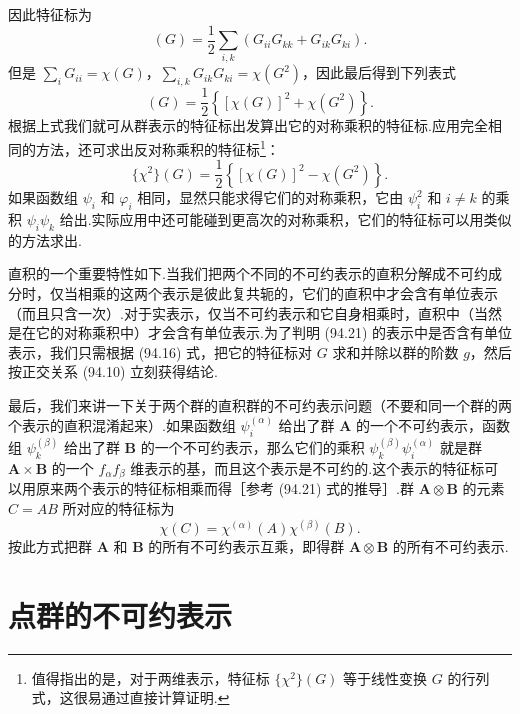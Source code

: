 因此特征标为
\begin{equation*}
  [\chi^2](G)=\frac{1}{2}\sum_{i,k}\left(G_{ii}G_{kk}+G_{ik}G_{ki}\right).
\end{equation*}
但是 $\sum_i G_{ii}=\chi(G)$，$\sum_{i,k}G_{ik}G_{ki}=\chi(G^2)$，因此最后得到下列表式
\begin{equation}
  [\chi^2](G)=\frac{1}{2}\left\{\left[\chi(G)\right]^2+\chi(G^2)\right\}.
\end{equation}
根据上式我们就可从群表示的特征标出发算出它的对称乘积的特征标.应用完全相同的方法，还可求出反对称乘积的特征标\footnote{值得指出的是，对于两维表示，特征标 $\{\chi^2\}(G)$ 等于线性变换 $G$ 的行列式，这很易通过直接计算证明.}：
\begin{equation}
  \{\chi^2\}(G)=\frac{1}{2}\left\{\left[\chi(G)\right]^2-\chi(G^2)\right\}.
\end{equation}
如果函数组 $\psi_i$ 和 $\varphi_i$ 相同，显然只能求得它们的对称乘积，它由 $\psi_i^2$ 和 $i\neq k$ 的乘积 $\psi_i\psi_k$ 给出.实际应用中还可能碰到更高次的对称乘积，它们的特征标可以用类似的方法求出.

直积的一个重要特性如下.当我们把两个不同的不可约表示的直积分解成不可约成分时，仅当相乘的这两个表示是彼此复共轭的，它们的直积中才会含有单位表示（而且只含一次）.对于实表示，仅当不可约表示和它自身相乘时，直积中（当然是在它的对称乘积中）才会含有单位表示.为了判明 (94.21) 的表示中是否含有单位表示，我们只需根据 (94.16) 式，把它的特征标对 $G$ 求和并除以群的阶数 $g$，然后按正交关系 (94.10) 立刻获得结论.

最后，我们来讲一下关于两个群的直积群的不可约表示问题（不要和同一个群的两个表示的直积混淆起来）.如果函数组 $\psi_i^{(\alpha)}$ 给出了群 $\boldsymbol{A}$ 的一个不可约表示，函数组 $\psi_k^{(\beta)}$ 给出了群 $\boldsymbol{B}$ 的一个不可约表示，那么它们的乘积 $\psi_k^{(\beta)}\psi_i^{(\alpha)}$ 就是群 $\boldsymbol{A}\times\boldsymbol{B}$ 的一个 $f_\alpha f_\beta$ 维表示的基，而且这个表示是不可约的.这个表示的特征标可以用原来两个表示的特征标相乘而得［参考 (94.21) 式的推导］.群 $\boldsymbol{A}\otimes\boldsymbol{B}$ 的元素 $C=AB$ 所对应的特征标为
\begin{equation}
  \chi(C)=\chi^{(\alpha)}(A)\chi^{(\beta)}(B).
\end{equation}
按此方式把群 $\boldsymbol{A}$ 和 $\boldsymbol{B}$ 的所有不可约表示互乘，即得群 $\boldsymbol{A}\otimes\boldsymbol{B}$ 的所有不可约表示.

\section{点群的不可约表示}


